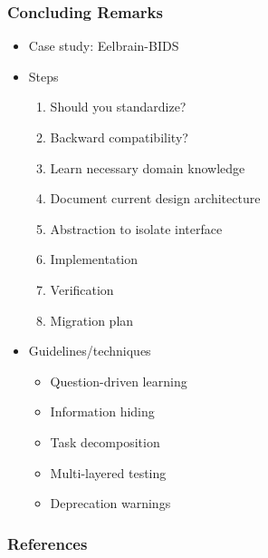 \documentclass{beamer}
\begin{document}
\begin{frame}

\frametitle{Concluding Remarks}

\begin{itemize}

\item Case study: Eelbrain-BIDS
\item Steps
\begin{enumerate}
\item Should you standardize?
\item Backward compatibility?
\item Learn necessary domain knowledge
\item Document current design architecture
\item Abstraction to isolate interface
\item Implementation
\item Verification
\item Migration plan
\end{enumerate}
\item Guidelines/techniques
\begin{itemize}
  \item Question-driven learning
  \item Information hiding  
  \item Task decomposition
  \item Multi-layered testing 
  \item Deprecation warnings
\end{itemize}

\end{itemize}

\end{frame}


\begin{frame}[allowframebreaks]
\frametitle{References}
 

\end{frame}

\end{document}
